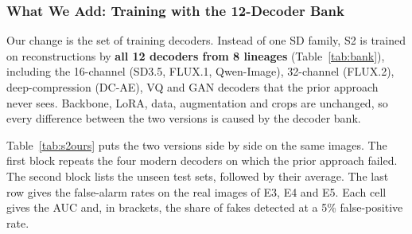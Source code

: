 \subsubsection{What We Add: Training with the 12-Decoder Bank}

Our change is the set of training decoders. Instead of one SD family, S2 is trained on reconstructions by \textbf{all 12 decoders from 8 lineages} (Table~\ref{tab:bank}), including the 16-channel (SD3.5, FLUX.1, Qwen-Image), 32-channel (FLUX.2), deep-compression (DC-AE), VQ and GAN decoders that the prior approach never sees. Backbone, LoRA, data, augmentation and crops are unchanged, so every difference between the two versions is caused by the decoder bank.

Table~\ref{tab:s2ours} puts the two versions side by side on the same images. The first block repeats the four modern decoders on which the prior approach failed. The second block lists the unseen test sets, followed by their average. The last row gives the false-alarm rates on the real images of E3, E4 and E5. Each cell gives the AUC and, in brackets, the share of fakes detected at a 5\% false-positive rate.

